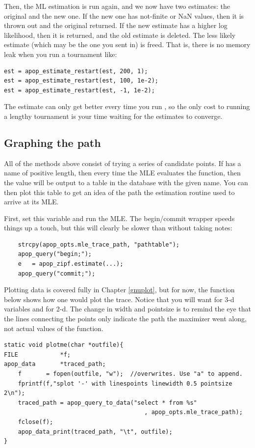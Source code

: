 Then, the ML estimation is run again, and we now have two estimates: the
original and the new one. If the new one has not-finite or NaN values,
then it is thrown out and the original returned. If the new estimate 
has a higher log likelihood, then it is returned, and the old estimate
is deleted.  The less likely estimate (which may be the one you sent in) is freed. That is,
there is no memory leak when you run a tournament like:
\begin{lstlisting}
est = apop_estimate_restart(est, 200, 1);
est = apop_estimate_restart(est, 100, 1e-2);
est = apop_estimate_restart(est, -1, 1e-2);
\end{lstlisting}
The estimate can only get better every time you run
, so the only cost to running a lengthy
tournament is your time waiting for the estimates to converge.

\subsection{Graphing the path} All of the methods above consist of
trying a series of candidate points. 
If 
has a name of positive
length, then every time the MLE evaluates the function, then the value
will be output to a table in the database with the given name. You can
then plot this table to get an idea of the path the estimation routine
used to arrive at its MLE.

First, set this variable and run the MLE. The begin/commit wrapper
speeds things up a touch, but this will clearly be slower than without
taking notes:
\begin{lstlisting}
    strcpy(apop_opts.mle_trace_path, "pathtable");
    apop_query("begin;");
    e   = apop_zipf.estimate(...);
    apop_query("commit;");
\end{lstlisting}
Plotting data is covered fully in Chapter \ref{gnuplot}, but for now,
the function below shows how one would plot the trace.  Notice that you will want
 for 3-d variables and  for 2-d. The change in width
and pointsize is to remind the eye that the lines connecting the points
only indicate the path the maximizer went along, not actual values of
the function.
\begin{lstlisting}
static void plotme(char *outfile){
FILE            *f;
apop_data       *traced_path;
    f       = fopen(outfile, "w");  //overwrites. Use "a" to append.
    fprintf(f,"splot '-' with linespoints linewidth 0.5 pointsize 2\n");
    traced_path = apop_query_to_data("select * from %s"
                                        , apop_opts.mle_trace_path);
    fclose(f);
    apop_data_print(traced_path, "\t", outfile);
}
\end{lstlisting}

